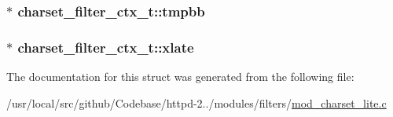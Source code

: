 \subsubsection[{\texorpdfstring{tmpbb}{tmpbb}}]{$\ast$ charset\+\_\+filter\+\_\+ctx\+\_\+t\+::tmpbb}\hypertarget{structcharset__filter__ctx__t_ab7a81885b0b4b889a4e592a10cf13f99}{}\label{structcharset__filter__ctx__t_ab7a81885b0b4b889a4e592a10cf13f99}
\subsubsection[{\texorpdfstring{xlate}{xlate}}]{$\ast$ charset\+\_\+filter\+\_\+ctx\+\_\+t\+::xlate}\hypertarget{structcharset__filter__ctx__t_a46d8ca19c551d1739620eb5c51d0ddbc}{}\label{structcharset__filter__ctx__t_a46d8ca19c551d1739620eb5c51d0ddbc}


The documentation for this struct was generated from the following file\+:\begin{DoxyCompactItemize}
\item 
/usr/local/src/github/\+Codebase/httpd-\/2../modules/filters/\hyperlink{mod__charset__lite_8c}{mod\+\_\+charset\+\_\+lite.\+c}\end{DoxyCompactItemize}
